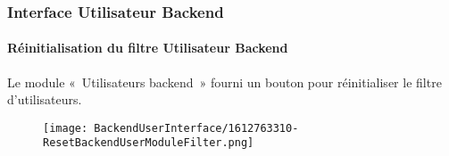 %

\begin{frame}[fragile]
	\frametitle{Interface Utilisateur Backend}
	\framesubtitle{Réinitialisation du filtre Utilisateur Backend}

	Le module «~Utilisateurs backend~» fourni un bouton pour réinitialiser le filtre d'utilisateurs.

	\begin{figure}
		\texttt{[image: BackendUserInterface/1612763310-ResetBackendUserModuleFilter.png]}
	\end{figure}

\end{frame}


